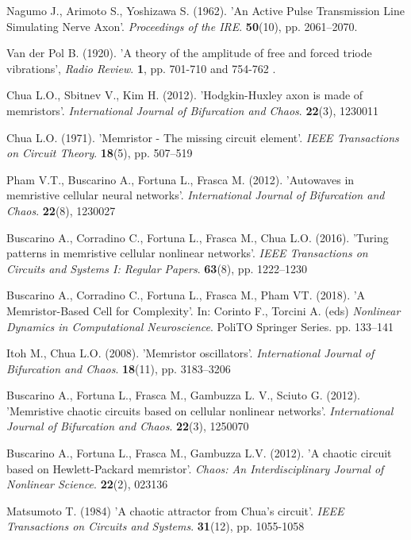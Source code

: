 \documentclass[11pt,letterpaper]{article}
\begin{document}
\begin{multicols*}{2}
\begin{thebibliography}{9}
 Nagumo J., Arimoto S., Yoshizawa S. (1962). 'An Active Pulse Transmission Line Simulating Nerve Axon'. \textit{Proceedings of the IRE}. \textbf{50}(10), pp. 2061–2070.

 Van der Pol B. (1920). 'A theory of the amplitude of free and forced triode
vibrations', \textit{Radio Review}. \textbf{1}, pp. 701-710 and 754-762 .

 Chua L.O., Sbitnev V., Kim H. (2012). 'Hodgkin-Huxley axon is made of memristors'. \textit{International Journal of Bifurcation and Chaos}.  \textbf{22}(3), 1230011 

 Chua L.O. (1971). 'Memristor - The missing circuit element'. \textit{IEEE Transactions on Circuit Theory}.  \textbf{18}(5), pp. 507–519

 Pham V.T., Buscarino A., Fortuna L., Frasca M. (2012). 'Autowaves in memristive cellular neural networks'. \textit{International Journal of Bifurcation and Chaos}. \textbf{22}(8), 1230027 

 Buscarino A., Corradino C., Fortuna L., Frasca M., Chua L.O. (2016). 'Turing patterns in memristive cellular nonlinear networks'. \textit{IEEE Transactions on Circuits and Systems I: Regular Papers}. \textbf{63}(8), pp. 1222–1230 

 Buscarino A., Corradino C., Fortuna L., Frasca M., Pham VT. (2018). 'A Memristor-Based Cell for Complexity'. In: Corinto F., Torcini A. (eds) \textit{Nonlinear Dynamics in Computational Neuroscience}. PoliTO Springer Series. pp. 133–141

 Itoh M., Chua L.O. (2008). 'Memristor oscillators'. \textit{International Journal of Bifurcation and Chaos}. \textbf{18}(11), pp. 3183–3206 

 Buscarino A.,  Fortuna L., Frasca M., Gambuzza L. V., Sciuto G. (2012). 'Memristive chaotic circuits based on cellular nonlinear networks'. \textit{International Journal of Bifurcation and Chaos}. \textbf{22}(3), 1250070

 Buscarino A., Fortuna L., Frasca M., Gambuzza L.V. (2012). 'A chaotic circuit based on Hewlett-Packard memristor'. \textit{Chaos: An Interdisciplinary Journal of Nonlinear Science}. \textbf{22}(2), 023136

 Matsumoto T. (1984) 'A chaotic attractor from Chua's circuit'. \textit{IEEE Transactions on Circuits and Systems}. \textbf{31}(12), pp. 1055-1058


\end{thebibliography}
\end{multicols*}
\end{document}
